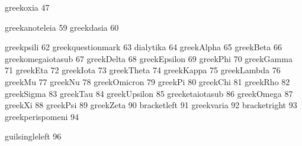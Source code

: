  greekoxia                          47

 greekanoteleia  	            59
 greekdasia                         60

 greekpsili                         62
 greekquestionmark                  63
 dialytika                          64
 greekAlpha                         65
 greekBeta                          66
 greekomegaiotasub                  67
 greekDelta                         68
 greekEpsilon                       69
 greekPhi                           70
 greekGamma                         71
 greekEta                           72
 greekIota                          73
 greekTheta                         74
 greekKappa                         75
 greekLambda                        76
 greekMu                            77
 greekNu                            78
 greekOmicron                       79
 greekPi                            80
 greekChi                           81
 greekRho                           82
 greekSigma                         83
 greekTau                           84
 greekUpsilon                       85
 greeketaiotasub                    86
 greekOmega                         87
 greekXi                            88
 greekPsi                           89
 greekZeta                          90
 bracketleft                        91
 greekvaria                         92
 bracketright                       93
 greekperispomeni                   94

 guilsingleleft                     96

